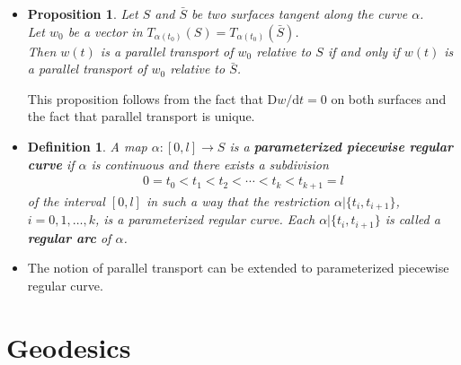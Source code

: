\documentclass[10pt]{article}
\newtheorem{definition}[lemma]{Definition}
\newtheorem{proposition}[lemma]{Proposition}
\newcommand{\dee}{\mathrm{d}}
\newcommand{\Dee}{\mathrm{D}}
\newcommand{\ra}{\rightarrow}
\begin{document}
\begin{itemize}
    \item \begin{proposition}
      Let $S$ and $\bar S$ be two surfaces tangent along the curve $\alpha$.\\
      Let $w_0$ be a vector in $T_{\alpha(t_0)}(S) = T_{\alpha(t_0)}(\bar S)$.\\
      Then $w(t)$ is a parallel transport of $w_0$ relative to $S$ if and only if $w(t)$ is a parallel transport of $w_0$ relative to $\bar S$.
    \end{proposition}

    This proposition follows from the fact that $\Dee w / \dee t = 0$ on both surfaces and the fact that parallel transport is unique.

    \item \begin{definition}
    A map $\alpha : [0,l] \ra S$ is a {\bf parameterized piecewise regular curve} if $\alpha$ is continuous and there exists a subdivision
    \begin{align*}
      0 = t_0 < t_1 < t_2 < \dotsb < t_k < t_{k+1} = l
    \end{align*}
    of the interval $[0,l]$ in such a way that the restriction $\alpha | \{ t_i, t_{i+1} \}$, $i = 0, 1, \dotsc, k$, is a parameterized regular curve. Each $\alpha| \{ t_i, t_{i+1} \}$ is called a {\bf regular arc} of $\alpha$.
    \end{definition}

    \item The notion of parallel transport can be extended to parameterized piecewise regular curve. 
  \end{itemize}  

  \section{Geodesics}
\end{document}

